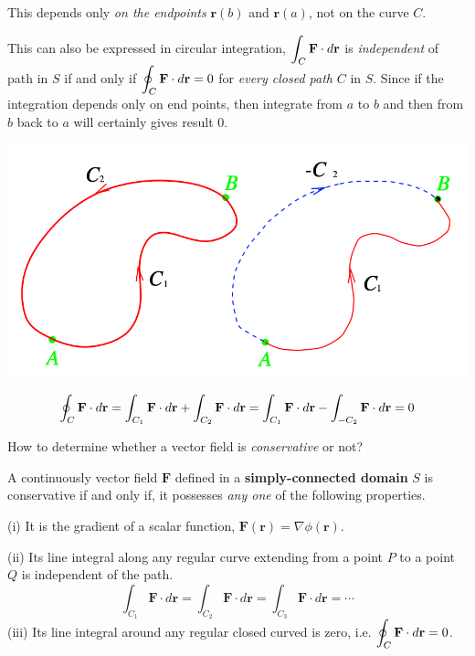 \documentclass[11pt, a4paper]{MATH2023}
\newcommand{\rr}{{\bf r}}
\newcommand{\FF}{{\bf F}}
\begin{document}
\begin{spacing}{1.3}
    This depends only {\it on the endpoints} $\mathbf{r}(b)$ and $\mathbf{r}(a)$, not on the curve $C.$

    \vspace{0.5in}
    This can also be expressed in circular integration, $\disp \int_C \FF\cdot d\rr$ is {\it independent} of 
    path in $S$ if and only if $\disp \oint_C \FF\cdot d\rr =0$ for {\it every closed path} $C$ in $S$.
    Since if the integration depends only on end points, then integrate from $a$ to $b$ and then from $b$
    back to $a$ will certainly gives result 0.
    \begin{center}
        \includegraphics[scale=0.4]{images/Ch15-circular-integ.png}
    \end{center}
    $$\oint_{C} \FF \cdot d \rr =\int_{C_{1}} \FF \cdot d \rr+\int_{C_{2}} \mathbf{F} \cdot d \mathbf{r} 
    =\int_{C_{1}} \mathbf{F} \cdot d \mathbf{r}-\int_{-C_{2}} \mathbf{F} \cdot d \mathbf{r}=0 $$

    \newpage
    {\blue How to determine whether a vector field is {\it conservative} or not?}

    A continuously vector field $\mathbf{F}$ defined in a {\bf simply-connected domain} $S$ is conservative 
    if and only if, it possesses {\it any one} of the following properties.
    
    (i) It is the gradient of a scalar function, $\mathbf{F}(\mathbf{r})=\nabla \phi(\mathbf{r})$.
    
    (ii) Its line integral along any regular curve extending from a point $P$ to a point $Q$ is independent of the path.
    $$
    \int_{C_{1}} \mathbf{F} \cdot d \mathbf{r}=\int_{C_{2}} \mathbf{F} \cdot d \mathbf{r}=\int_{C_{3}} \mathbf{F} \cdot d \mathbf{r}=\cdots
    $$
    (iii) Its line integral around any regular closed curved is zero, i.e. $\displaystyle \oint_{C} \mathbf{F} \cdot d \mathbf{r}=0$.


\end{spacing}
\end{document}
